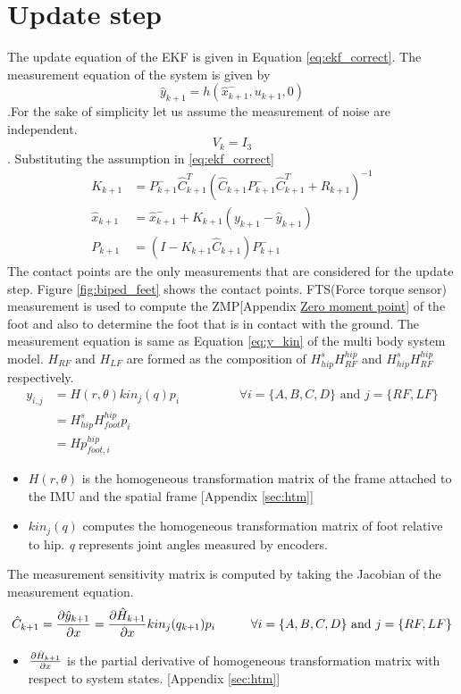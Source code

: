 \section{Update step}
The update equation of the EKF is given in Equation \ref{eq:ekf_correct}. The measurement equation of the system is given by $$\hat{y}_{k+1} = h(\hat{x}_{k+1}^-,u_{k+1},0)$$.For the sake of simplicity let us assume the measurement of noise are independent. $$V_k = I_3$$. Substituting the assumption in \ref{eq:ekf_correct}
\begin{equation}
\label{eq:imu_correct}
\begin{split}
K_{k+1} &= P_{k+1}^-\hat{C}_{k+1}^{T}(\hat{C}_{k+1}P_{k+1}^-\hat{C}_{k+1}^{T} + R_{k+1})^{-1}\\
\hat{x}_{k+1} &= \hat{x}_{k+1}^- + K_{k+1}(y_{k+1}-\hat{y}_{k+1})\\
P_{k+1} &= (I- K_{k+1}\hat{C}_{k+1})P_{k+1}^-
\end{split}
\end{equation}
The contact points are the only measurements that are considered for the update step. Figure \ref{fig:biped_feet} shows the contact points. FTS(Force torque sensor) measurement is used to compute the ZMP[Appendix \underline{Zero moment point}] of the foot and also to determine the foot that is in contact with the ground. The measurement equation is same as Equation \ref{eq:y_kin} of the multi body system model. $H_{RF} \text{ and } H_{LF} $ are formed as the composition of $H_{hip}^s H_{RF}^{hip}$ and $H_{hip}^s H_{RF}^{hip}$ respectively.
\begin{equation}
    \label{eq:imu_msr}
    \begin{split}
    y_{i,j} &= H(r,\theta) kin_j(q)p_i \hspace{2cm} \forall i=\{A,B,C,D\} \text{ and } j=\{RF,LF\} \\
    &= H_{hip}^s H_{foot}^{hip}p_i \\
    &= H p_{foot,i}^{hip}
    \end{split}
\end{equation}
\begin{itemize}
    \item $H(r,\theta)$ is the homogeneous transformation matrix of the frame attached to the IMU and the spatial frame [Appendix \ref{sec:htm}]
    \item $kin_j(q)$ computes the homogeneous transformation matrix of foot relative to hip. \emph{q} represents joint angles measured by encoders.
\end{itemize}
The measurement sensitivity matrix is computed by taking the Jacobian of the measurement equation.
\begin{equation}
        \hat{C}_{k+1} = \frac{\partial {\hat{y}_{k+1}}}{\partial {x}} = \frac{\partial {\hat{H}_{k+1}}}{\partial {x}} kin_j(q_{k+1}) p_i \hspace{1cm} \forall i=\{A,B,C,D\} \text{ and } j=\{RF,LF\} 
\end{equation}
\begin{itemize}
    \item $\frac{\partial {\hat{H}_{k+1}}}{\partial {x}}$ is the partial derivative of homogeneous transformation matrix with respect to system states. [Appendix \ref{sec:htm}]
\end{itemize}


